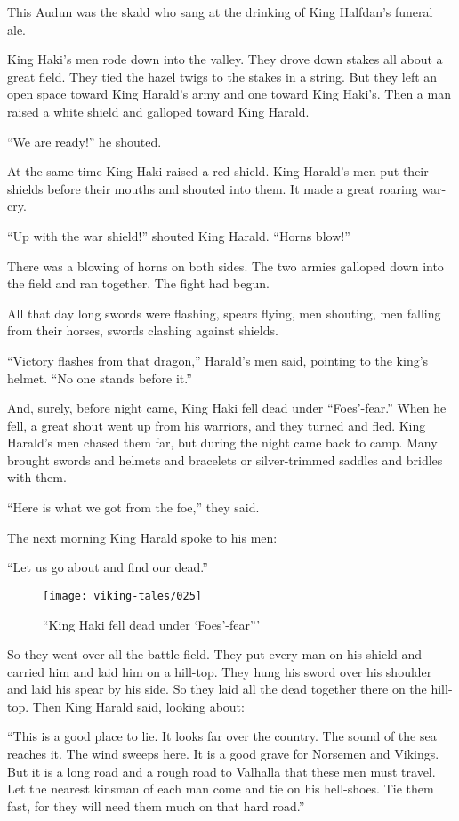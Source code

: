 This Audun was the skald who sang at the drinking of King Halfdan's
funeral ale.

King Haki's men rode down into the valley. They drove down stakes all
about a great field. They tied the hazel twigs to the stakes in a
string. But they left an open space toward King Harald's army and one
toward King Haki's. Then a man raised a white shield and galloped toward
King Harald.

``We are ready!'' he shouted.

At the same time King Haki raised a red shield. King Harald's men put
their shields before their mouths and shouted into them. It made a great
roaring war-cry.

``Up with the war shield!'' shouted King Harald. ``Horns blow!''

There was a blowing of horns on both sides. The two armies galloped down
into the field and ran together. The fight had begun.

All that day long swords were flashing, spears flying, men shouting, men
falling from their horses, swords clashing against shields.

``Victory flashes from that dragon,'' Harald's men said, pointing to the
king's helmet. ``No one stands before it.''

And, surely, before night came, King Haki fell dead under
``Foes'-fear.'' When he fell, a great shout went up from his warriors,
and they turned and fled. King Harald's men chased them far, but during
the night came back to camp. Many brought swords and helmets and
bracelets or silver-trimmed saddles and bridles with them.

``Here is what we got from the foe,'' they said.

The next morning King Harald spoke to his men:

``Let us go about and find our dead.''

\begin{figure}[ht]
    \centering
    \texttt{[image: viking-tales/025]}
    \caption{``King Haki fell dead under `Foes'-fear'''}
\end{figure}

So they went over all the battle-field. They put every man on his shield
and carried him and laid him on a hill-top. They hung his sword over his
shoulder and laid his spear by his side. So they laid all the dead
together there on the hill-top. Then King Harald said, looking about:

``This is a good place to lie. It looks far over the country. The sound
of the sea reaches it. The wind sweeps here. It is a good grave for
Norsemen and Vikings. But it is a long road and a rough road to Valhalla
that these men must travel. Let the nearest kinsman of each man come and
tie on his hell-shoes. Tie them fast, for they will need them much on
that hard road.''

